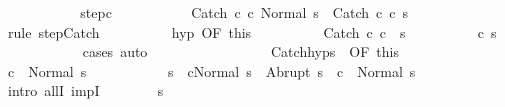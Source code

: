 \begin{isabellebody}
\ {\isacharminus}\isanewline
\ \ \ \ \ \ \ \ \isamarkupfalse%
\ step{\isacharunderscore}c\isanewline
\ \ \ \ \ \ \ \ \isamarkupfalse%
\ {\isachardoublequoteopen}{\isasymGamma}{\isasymturnstile}\ {\isacharparenleft}Catch\ c\ c\ Normal\ s{\isacharparenright}\ {\isasymrightarrow}\ {\isacharparenleft}Catch\ c{\isacharprime}\ c\ s{\isacharprime}{\isacharparenright}{\isachardoublequoteclose}\isanewline
\ \ \ \ \ \ \ \ \ \ \isamarkupfalse%
\ {\isacharparenleft}rule\ step{\isachardot}Catch{\isacharparenright}\isanewline
\ \ \ \ \ \ \ \ \isamarkupfalse%
\ hyp\ {\isacharbrackleft}OF\ this{\isacharbrackright}\isanewline
\ \ \ \ \ \ \ \ \isamarkupfalse%
\ {\isachardoublequoteopen}{\isasymGamma}{\isasymturnstile}Catch\ c{\isacharprime}\ c\ {\isasymdown}\ s{\isacharprime}{\isachardoublequoteclose}\isacommand{{\isachardot}}\isamarkupfalse%
\isanewline
\ \ \ \ \ \ \ \ \isamarkupfalse%
\ {\isachardoublequoteopen}{\isasymGamma}{\isasymturnstile}c{\isacharprime}{\isasymdown}\ s{\isacharprime}{\isachardoublequoteclose}\isanewline
\ \ \ \ \ \ \ \ \ \ \isamarkupfalse%
\ cases\ auto\isanewline
\ \ \ \ \ \ \isamarkupfalse%
\isanewline
\ \ \ \ \isacommand{{\isacharbraceright}}\isamarkupfalse%
\isanewline
\ \ \ \ \isamarkupfalse%
\ Catch{\isachardot}hyps\ {\isacharparenleft}{}{\isacharparenright}\ {\isacharbrackleft}OF\ this{\isacharbrackright}\isanewline
\ \ \ \ \isamarkupfalse%
\ {\isachardoublequoteopen}{\isasymGamma}{\isasymturnstile}c\ {\isasymdown}\ Normal\ s{\isachardoublequoteclose}\isacommand{{\isachardot}}\isamarkupfalse%
\isanewline
\ \ \isamarkupfalse%
\ \ \isanewline
\ \ \ \ \isamarkupfalse%
\ {\isachardoublequoteopen}{\isasymforall}s{\isacharprime}{\isachardot}\ {\isasymGamma}{\isasymturnstile}\ {\isasymlangle}cNormal\ s{\isasymrangle}\ {\isasymRightarrow}\ Abrupt\ s{\isacharprime}\ {\isasymlongrightarrow}\ {\isasymGamma}{\isasymturnstile}c\ {\isasymdown}\ Normal\ s{\isacharprime}{\isachardoublequoteclose}\isanewline
\ \ \ \ \isamarkupfalse%
\ {\isacharparenleft}intro\ allI\ impI{\isacharparenright}\isanewline
\ \ \ \ \ \ \isamarkupfalse%
\ s{\isacharprime}\isanewline
\ \ \ \ \ \ \isamarkupfalse%

\end{isabellebody}
